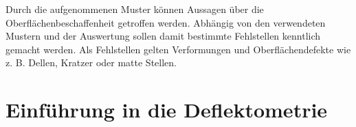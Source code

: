 \p
Durch die aufgenommenen Muster können Aussagen über die Oberflächenbeschaffenheit getroffen werden.
Abhängig von den verwendeten Mustern und der Auswertung sollen damit bestimmte Fehlstellen kenntlich gemacht werden.
Als Fehlstellen gelten Verformungen und Oberflächendefekte wie z. B. Dellen, Kratzer oder matte Stellen.

{
	\FloatBarrier
    \section{Einführung in die Deflektometrie}
    \label{sec:deflektometrie}
    
}
